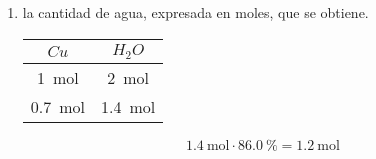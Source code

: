 \documentclass[../practica.root.tex]{subfiles}
\begin{document}
\begin{enumerate}
\begin{enumerate}
\begin{enumerate}[label=\roman*)]
			            \item la cantidad de agua, expresada en moles, que se obtiene.
			                  \begin{center}

				                  \begin{tabular}{c|c}
					                  $Cu$            & $H_2O$          \\
					                  \hline
					                  \SI{1}{\mole}   & \SI{2}{\mole}   \\
					                  \SI{0,7}{\mole} & \SI{1,4}{\mole} \\
				                  \end{tabular}
			                  \end{center}
			                  \[ \SI{1,4}{\mole}\cdot\SI{86,0}{\percent} = \boxed{\SI{1,2}{\mole}} \]
		            \end{enumerate}
	      \end{enumerate}

\end{enumerate}
\end{document}

